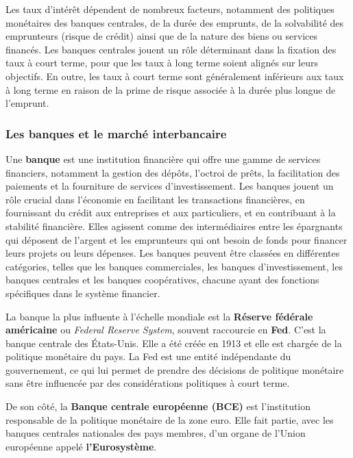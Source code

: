 Les taux d'intérêt dépendent de nombreux facteurs, notamment des politiques monétaires des banques centrales, de la durée des emprunts, de la solvabilité des emprunteurs (risque de crédit) ainsi que de la nature des biens ou services financés. Les banques centrales jouent un rôle déterminant dans la fixation des taux à court terme, pour que les taux à long terme soient alignés sur leurs objectifs. En outre, les taux à court terme sont généralement inférieurs aux taux à long terme en raison de la prime de risque associée à la durée plus longue de l'emprunt. \cite{banque_de_france1}

\subsubsection{Les banques et le marché interbancaire}

Une \textbf{banque} est une institution financière qui offre une gamme de services financiers, notamment la gestion des dépôts, l'octroi de prêts, la facilitation des paiements et la fourniture de services d'investissement. Les banques jouent un rôle crucial dans l'économie en facilitant les transactions financières, en fournissant du crédit aux entreprises et aux particuliers, et en contribuant à la stabilité financière. Elles agissent comme des intermédiaires entre les épargnants qui déposent de l'argent et les emprunteurs qui ont besoin de fonds pour financer leurs projets ou leurs dépenses. Les banques peuvent être classées en différentes catégories, telles que les banques commerciales, les banques d'investissement, les banques centrales et les banques coopératives, chacune ayant des fonctions spécifiques dans le système financier.

La banque la plus influente à l'échelle mondiale est la \textbf{Réserve fédérale américaine} ou \textit{Federal Reserve System}, souvent raccourcie en \textbf{Fed}. C'est la banque centrale des États-Unis. Elle a été créée en 1913 et elle est chargée de la politique monétaire du pays. La Fed est une entité indépendante du gouvernement, ce qui lui permet de prendre des décisions de politique monétaire sans être influencée par des considérations politiques à court terme.

De son côté, la \textbf{Banque centrale européenne (BCE)} est l'institution responsable de la politique monétaire de la zone euro. Elle fait partie, avec les banques centrales nationales des pays membres, d'un organe de l'Union européenne appelé \textbf{l'Eurosystème}.

